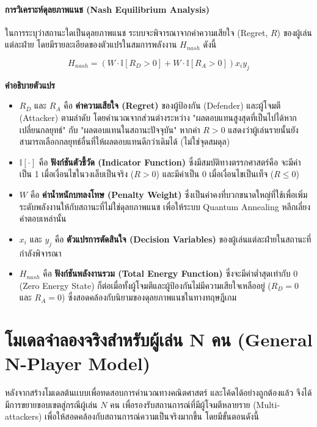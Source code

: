 \paragraph{การวิเคราะห์ดุลยภาพแนช (Nash Equilibrium Analysis)}
ในการระบุว่าสถานะใดเป็นดุลยภาพแนช ระบบจะพิจารณาจากค่าความเสียใจ (Regret, $R$) ของผู้เล่นแต่ละฝ่าย โดยมีรายละเอียดของตัวแปรในสมการพลังงาน $H_{nash}$ ดังนี้

\begin{equation}
H_{nash} = (W \cdot \mathbb{I}[R_D > 0] + W \cdot \mathbb{I}[R_A > 0]) x_i y_j
\end{equation}

\noindent \textbf{คำอธิบายตัวแปร}
\begin{itemize}
    \item $R_D$ และ $R_A$ คือ \textbf{ค่าความเสียใจ (Regret)} ของผู้ป้องกัน (Defender) และผู้โจมตี (Attacker) ตามลำดับ โดยคำนวณจากส่วนต่างระหว่าง "ผลตอบแทนสูงสุดที่เป็นไปได้หากเปลี่ยนกลยุทธ์" กับ "ผลตอบแทนในสถานะปัจจุบัน" หากค่า $R > 0$ แสดงว่าผู้เล่นรายนั้นยังสามารถเลือกกลยุทธ์อื่นที่ให้ผลตอบแทนดีกว่าเดิมได้ (ไม่ใช่จุดสมดุล)
    \item $\mathbb{I}[\cdot]$ คือ \textbf{ฟังก์ชันตัวชี้วัด (Indicator Function)} ซึ่งมีสมบัติทางตรรกศาสตร์คือ จะมีค่าเป็น 1 เมื่อเงื่อนไขในวงเล็บเป็นจริง ($R > 0$) และมีค่าเป็น 0 เมื่อเงื่อนไขเป็นเท็จ ($R \leq 0$) 
    \item $W$ คือ \textbf{ค่าน้ำหนักบทลงโทษ (Penalty Weight)} ซึ่งเป็นค่าคงที่บวกขนาดใหญ่ที่ใช้เพื่อเพิ่มระดับพลังงานให้กับสถานะที่ไม่ใช่ดุลยภาพแนช เพื่อให้ระบบ Quantum Annealing หลีกเลี่ยงคำตอบเหล่านั้น
    \item $x_i$ และ $y_j$ คือ \textbf{ตัวแปรการตัดสินใจ (Decision Variables)} ของผู้เล่นแต่ละฝ่ายในสถานะที่กำลังพิจารณา
    \item $H_{nash}$ คือ \textbf{ฟังก์ชันพลังงานรวม (Total Energy Function)} ซึ่งจะมีค่าต่ำสุดเท่ากับ 0 (Zero Energy State) ก็ต่อเมื่อทั้งผู้โจมตีและผู้ป้องกันไม่มีความเสียใจเหลืออยู่ ($R_D = 0$ และ $R_A = 0$) ซึ่งสอดคล้องกับนิยามของดุลยภาพแนชในทางทฤษฎีเกม
\end{itemize}

\section{โมเดลจำลองจริงสำหรับผู้เล่น N คน (General N-Player Model)}
หลังจากสร้างโมเดลต้นเเบบเพื่อทดสอบการคำนวณทางคณิตศาสตร์ และโค้ดได้อย่างถูกต้องแล้ว จึงได้มีการขยายขอบเขตสู่กรณีผู้เล่น $N$ คน เพื่อรองรับสถานการณ์ที่มีผู้โจมตีหลายราย (Multi-attackers) เพื่อให้สอดคล้องกับสถานการณ์ความเป็นจริงมากขึ้น โดยมีขั้นตอนดังนี้


